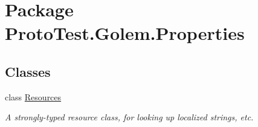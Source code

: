 \hypertarget{namespace_proto_test_1_1_golem_1_1_properties}{\section{Package Proto\-Test.\-Golem.\-Properties}
\label{namespace_proto_test_1_1_golem_1_1_properties}
}
\subsection*{Classes}
\begin{DoxyCompactItemize}
\item 
class \hyperlink{class_proto_test_1_1_golem_1_1_properties_1_1_resources}{Resources}
\begin{DoxyCompactList}\small\item\em A strongly-\/typed resource class, for looking up localized strings, etc. \end{DoxyCompactList}\end{DoxyCompactItemize}
